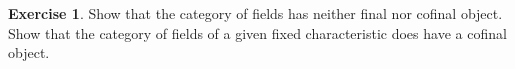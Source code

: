 \documentclass[11pt]{amsbook}
\def\bQ{{\mathbf{Q}}} \def\bZ{{\mathbf{Z}}} \def\N{{\mathbf{N}}}
\def\id{{\rm id}}
\def\Grp{\mathbf{Grp}}
\theoremstyle{plain}
\theoremstyle{definition}
\newtheorem{exercise}{Exercise}
\begin{document}
%
%
%
%
%
%

\begin{exercise}Show that the category of fields has neither final nor cofinal object. Show that the category of fields of a given fixed characteristic does have a cofinal object.
\end{exercise}

%
\end{document}
